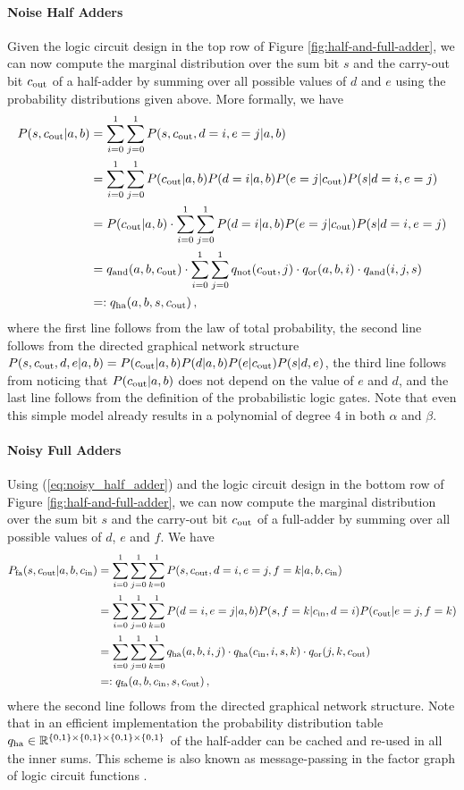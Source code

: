 \paragraph{Noise Half Adders} Given the logic circuit design in the top row of Figure \ref{fig:half-and-full-adder}, we can now compute the marginal distribution over the sum bit $s$ and the carry-out bit $c_{\mathrm{out}}$ of a half-adder by summing over all possible values of $d$ and $e$ using the probability distributions given above. More formally, we have
\begin{align}
    P(s,c_{\mathrm{out}}|a,b) & = \sum_{i=0}^1 \sum_{j=0}^1 P(s,c_{\mathrm{out}},d=i,e=j|a,b) \nonumber \\
    & = \sum_{i=0}^1 \sum_{j=0}^1 P(c_{\mathrm{out}}|a,b) P(d=i|a,b) P(e=j|c_{\mathrm{out}}) P(s|d=i,e=j) \nonumber \\
    & = P(c_{\mathrm{out}}|a,b) \cdot \sum_{i=0}^1 \sum_{j=0}^1 P(d=i|a,b) P(e=j|c_{\mathrm{out}}) P(s|d=i,e=j) \nonumber \\
    & = q_{\mathrm{and}}(a,b,c_{\mathrm{out}}) \cdot \sum_{i=0}^1 \sum_{j=0}^1 q_{\mathrm{not}}(c_{\mathrm{out}},j) \cdot q_{\mathrm{or}}(a,b,i) \cdot q_{\mathrm{and}}(i,j,s) \nonumber \\
    & =: q_{\mathrm{ha}}(a,b,s,c_{\mathrm{out}}) \label{eq:noisy_half_adder} \,,
\end{align}
where the first line follows from the law of total probability, the second line follows from the directed graphical network structure $P(s,c_{\mathrm{out}},d,e|a,b)=P(c_{\mathrm{out}}|a,b)P(d|a,b)P(e|c_{\mathrm{out}})P(s|d,e)$, the third line follows from noticing that $P(c_{\mathrm{out}}|a,b)$ does not depend on the value of $e$ and $d$, and the last line follows from the definition of the probabilistic logic gates. Note that even this simple model already results in a polynomial of degree 4 in both $\alpha$ and $\beta$.

\paragraph{Noisy Full Adders} Using (\ref{eq:noisy_half_adder}) and the logic circuit design in the bottom row of Figure \ref{fig:half-and-full-adder}, we can now compute the marginal distribution over the sum bit $s$ and the carry-out bit $c_{\mathrm{out}}$ of a full-adder by summing over all possible values of $d$, $e$ and $f$. We have
\begin{align}
    P_{\mathrm{fa}}(s,c_{\mathrm{out}}|a,b,c_{\mathrm{in}}) & = \sum_{i=0}^1 \sum_{j=0}^1 \sum_{k=0}^1 P(s,c_{\mathrm{out}},d=i,e=j,f=k|a,b,c_{\mathrm{in}}) \nonumber \\
    & = \sum_{i=0}^1 \sum_{j=0}^1 \sum_{k=0}^1 P(d=i,e=j|a,b) P(s,f=k|c_{\mathrm{in}},d=i) P(c_{\mathrm{out}}|e=j,f=k) \nonumber \\
    & = \sum_{i=0}^1 \sum_{j=0}^1 \sum_{k=0}^1 q_{\mathrm{ha}}(a,b,i,j) \cdot q_{\mathrm{ha}}(c_{\mathrm{in}},i,s,k) \cdot q_{\mathrm{or}}(j,k,c_{\mathrm{out}}) \nonumber \\
    & =: q_{\mathrm{fa}}(a,b,c_{\mathrm{in}},s,c_{\mathrm{out}}) \label{eq:noisy_full_adder} \,,
\end{align}
where the second line follows from the directed graphical network structure. Note that in an efficient implementation the probability distribution table $q_{\mathrm{ha}} \in \mathbb{R}^{\{0,1\}\times\{0,1\}\times\{0,1\}\times\{0,1\}}$ of the half-adder can be cached and re-used in all the inner sums. This scheme is also known as message-passing in the factor graph of logic circuit functions \cite{KscFreLoe2001y}.


